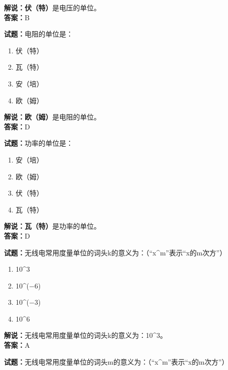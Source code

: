 \documentclass{ctexbook}
\begin{document}
\noindent\textbf{解说：伏（特）}是电压的单位。\cite[137-138]{si}\\
\noindent\textbf{答案：}B

\bigskip

\noindent\textbf{试题：}电阻的单位是：

\begin{enumerate}[leftmargin=3em]
  \item 伏（特）
  \item 瓦（特）
  \item 安（培）
  \item 欧（姆）
\end{enumerate}

\noindent\textbf{解说：欧（姆）}是电阻的单位。\cite[137-138]{si}\\
\noindent\textbf{答案：}D

\bigskip

\noindent\textbf{试题：}功率的单位是：

\begin{enumerate}[leftmargin=3em]
  \item 安（培）
  \item 欧（姆）
  \item 伏（特）
  \item 瓦（特）
\end{enumerate}

\noindent\textbf{解说：瓦（特）}是功率的单位。\cite[137-138]{si}\\
\noindent\textbf{答案：}D

\bigskip

\noindent\textbf{试题：}无线电常用度量单位的词头k的意义为：（“x\string^m”表示“x的m次方”）

\begin{enumerate}[leftmargin=3em]
  \item \num{10}\string^\num{3}
  \item \num{10}\string^(\num{-6})
  \item \num{10}\string^(\num{-3})
  \item \num{10}\string^\num{6}
\end{enumerate}

\noindent\textbf{解说：}无线电常用度量单位的词头k的意义为：\num{10}\string^\num{3}。\cite[143]{si}\\
\noindent\textbf{答案：}A

\bigskip

\noindent\textbf{试题：}无线电常用度量单位的词头m的意义为：（“x\string^m”表示“x的m次方”）
\end{document}
